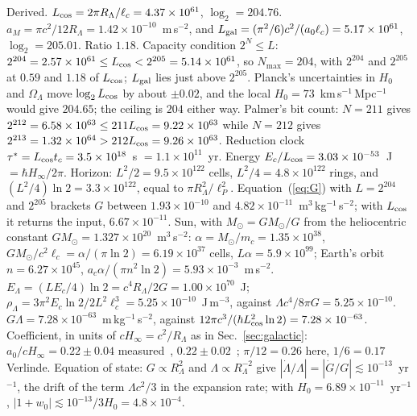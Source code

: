 \documentclass[aps,prd,twocolumn,superscriptaddress,nofootinbib,showkeys]{revtex4-2}
\newcommand{\lc}{\ell_c}
\newcommand{\tc}{t_c}
\newcommand{\mc}{m_c}
\newcommand{\Ec}{E_c}
\newcommand{\ac}{a_c}
\newcommand{\RL}{R_\Lambda}
\begin{document}
Derived. $L_{\rm cos} = 2\pi\RL/\lc = 4.37\times10^{61}$, $\log_2 = 204.76$. $a_M = \pi c^2/12\RL = 1.42\times10^{-10}$~m\,s$^{-2}$, and $L_{\rm gal} = (\pi^2/6)c^2/(a_0\lc) = 5.17\times10^{61}$, $\log_2 = 205.01$. Ratio $1.18$. Capacity condition $2^N\le L$: $2^{204} = 2.57\times10^{61}\le L_{\rm cos} < 2^{205} = 5.14\times10^{61}$, so $N_{\max}=204$, with $2^{204}$ and $2^{205}$ at $0.59$ and $1.18$ of $L_{\rm cos}$; $L_{\rm gal}$ lies just above $2^{205}$. Planck's uncertainties in $H_0$ and $\Omega_\Lambda$ move $\log_2L_{\rm cos}$ by about $\pm0.02$, and the local $H_0 = 73$~km\,s$^{-1}$\,Mpc$^{-1}$ would give $204.65$; the ceiling is $204$ either way. Palmer's bit count: $N=211$ gives $2^{212} = 6.58\times10^{63}\le 211L_{\rm cos} = 9.22\times10^{63}$ while $N=212$ gives $2^{213} = 1.32\times10^{64} > 212L_{\rm cos} = 9.26\times10^{63}$. Reduction clock $\tau^* = L_{\rm cos}\tc = 3.5\times10^{18}$~s $= 1.1\times10^{11}$~yr. Energy $\Ec/L_{\rm cos} = 3.03\times10^{-53}$~J $= \hbar H_\infty/2\pi$. Horizon: $L^2/2 = 9.5\times10^{122}$ cells, $L^2/4 = 4.8\times10^{122}$ rings, and $(L^2/4)\ln2 = 3.3\times10^{122}$, equal to $\pi\RL^2/\ell_P^2$. Equation~(\ref{eq:G}) with $L = 2^{204}$ and $2^{205}$ brackets $G$ between $1.93\times10^{-10}$ and $4.82\times10^{-11}$~m$^3$\,kg$^{-1}$\,s$^{-2}$; with $L_{\rm cos}$ it returns the input, $6.67\times10^{-11}$. Sun, with $M_\odot = GM_\odot/G$ from the heliocentric constant $GM_\odot = 1.327\times10^{20}$~m$^3$\,s$^{-2}$: $\alpha = M_\odot/\mc = 1.35\times10^{38}$, $GM_\odot/c^2\lc = \alpha/(\pi\ln2) = 6.19\times10^{37}$ cells, $L\alpha = 5.9\times10^{99}$; Earth's orbit $n = 6.27\times10^{45}$, $\ac\alpha/(\pi n^2\ln2) = 5.93\times10^{-3}$~m\,s$^{-2}$. $E_\Lambda = (L\Ec/4)\ln2 = c^4\RL/2G = 1.00\times10^{70}$~J; $\rho_\Lambda = 3\pi^2\Ec\ln2/2L^2\lc^3 = 5.25\times10^{-10}$~J\,m$^{-3}$, against $\Lambda c^4/8\pi G = 5.25\times10^{-10}$. $G\Lambda = 7.28\times10^{-63}$~m\,kg$^{-1}$\,s$^{-2}$, against $12\pi c^3/(\hbar L_{\rm cos}^2\ln2) = 7.28\times10^{-63}$. Coefficient, in units of $cH_\infty = c^2/\RL$ as in Sec.~\ref{sec:galactic}: $a_0/cH_\infty = 0.22\pm0.04$ measured~\cite{mcgaugh2016}, $0.22\pm0.02$~\cite{desmond2023}; $\pi/12 = 0.26$ here, $1/6 = 0.17$ Verlinde. Equation of state: $G\propto\RL^2$ and $\Lambda\propto\RL^{-2}$ give $|\dot\Lambda/\Lambda| = |\dot G/G|\lesssim10^{-13}$~yr$^{-1}$, the drift of the term $\Lambda c^2/3$ in the expansion rate; with $H_0 = 6.89\times10^{-11}$~yr$^{-1}$, $|1+w_0| \lesssim 10^{-13}/3H_0 = 4.8\times10^{-4}$.
\end{document}

